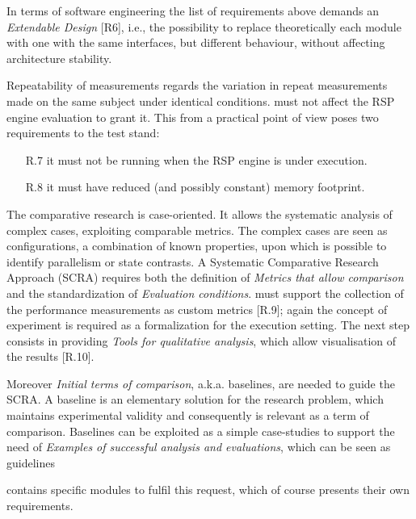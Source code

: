 In terms of software engineering the list of requirements above demands an \textit{Extendable Design} [R6], i.e.,  the possibility to replace theoretically each module with one with the same interfaces, but different behaviour, without affecting architecture stability.

Repeatability of measurements regards the variation in repeat measurements made on the same subject under identical conditions. \name must not affect the RSP engine evaluation to grant it. This from a practical point of view poses two requirements to the test stand:
\begin{enumerate}
\item[R.7] it must not be running when the RSP engine is under execution. %
\item[R.8] it must have reduced (and possibly constant) memory footprint. %
\end{enumerate}

The comparative research is case-oriented. It allows the systematic analysis of complex cases, exploiting comparable metrics. The complex cases are seen as configurations, a combination of known properties, upon which is possible to identify parallelism or state contrasts. A Systematic Comparative Research Approach (SCRA) requires both the definition of \textit{Metrics that allow comparison} and the standardization of \textit{Evaluation conditions}.  \name must support the collection of the performance measurements as custom metrics [R.9]; again the concept of experiment is required as a formalization for the execution setting. The next step consists in providing \textit{Tools for qualitative analysis}, which allow visualisation of the results [R.10].

Moreover \textit{Initial terms of comparison}, a.k.a. baselines, are needed to guide the SCRA. A baseline is an elementary solution for the research problem, which maintains experimental validity and consequently is relevant as a term of comparison. Baselines can be exploited as a simple case-studies to support the need of \textit{Examples of successful analysis and evaluations}, which can be seen as guidelines

\name contains specific modules to fulfil this request, which of course presents their own requirements.

